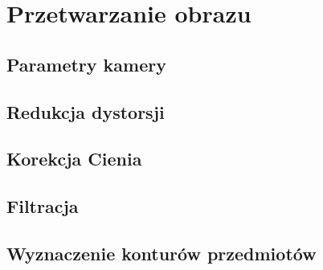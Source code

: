 \chapter{Przetwarzanie obrazu}
\label{cha:przetwarzanieObrazu}

\section{Parametry kamery}
\label{sec:parametryKamery}

\section{Redukcja dystorsji}
\label{sec:redukcjaDystorsji}

\section{Korekcja Cienia}
\label{sec:korekcjaCienia}

\section{Filtracja}
\label{sec:filtracja}

\section{Wyznaczenie konturów przedmiotów}
\label{sec:wyznaczenieKonturow}


